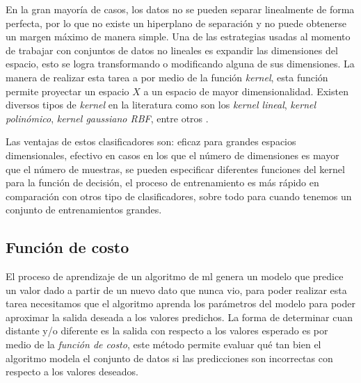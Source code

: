 En la gran mayoría de casos, los datos no se pueden separar linealmente de forma perfecta, por lo que no existe un hiperplano de separación y no puede obtenerse un margen máximo de manera simple. Una de las estrategias usadas al momento de trabajar con conjuntos de datos no lineales es expandir las dimensiones del espacio, esto se logra transformando o modificando alguna de sus dimensiones. La manera de realizar esta tarea a por medio de la función  \textit{kernel}, esta función permite proyectar un espacio $ X$ a un espacio de mayor dimensionalidad. Existen diversos tipos de \textit{kernel} en la literatura como son los \textit{kernel lineal}, \textit{kernel polinómico}, \textit{kernel gaussiano RBF}, entre otros \citep{SVM}. 


Las ventajas de estos clasificadores son: eficaz para grandes espacios dimensionales, efectivo en casos en los que el número de dimensiones es mayor que el número de muestras, se pueden especificar diferentes funciones del kernel para la función de decisión, el proceso de entrenamiento es más rápido en comparación con otros tipo de clasificadores, sobre todo para cuando tenemos un conjunto de entrenamientos grandes.

\subsection{Función de costo}\label{sub:funcion_costo}


El proceso de aprendizaje de un algoritmo de \ac{ml} genera un  modelo que predice un valor dado a partir de un nuevo dato que nunca vio, para poder realizar esta tarea necesitamos que el algoritmo aprenda los parámetros del modelo para poder aproximar la salida deseada a los valores predichos. La forma de determinar cuan distante y/o diferente es la salida con respecto a los valores esperado es por medio de la \textit{función de costo}, este método permite evaluar qué tan bien el algoritmo modela el conjunto de datos si las predicciones son incorrectas con respecto a los valores deseados. 

